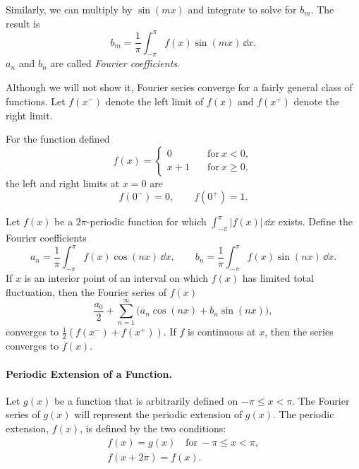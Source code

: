 Similarly, we can multiply by $\sin(m x)$ and integrate to solve for $b_m$.
The result is
\[ 
b_m = \frac{1}{\pi} \int_{-\pi}^\pi f(x) \sin(m x)\,\dd x. 
\]
$a_n$ and $b_n$ are called \textit{Fourier coefficients}.



Although we will not show it, Fourier series converge for a 
fairly general class of functions.
Let $f(x^-)$ denote the left limit of $f(x)$ and $f(x^+)$ denote the right
limit.




\begin{Example}
  For the function defined
  \[ f(x) = 
  \begin{cases}
    0 \quad &\mathrm{for}\ x < 0, \\
    x + 1 \quad &\mathrm{for}\ x \geq 0,
  \end{cases}
  \]
  the left and right limits at $x = 0$ are
  \[ f(0^-) = 0, \qquad f(0^+) = 1.\]
\end{Example}








\begin{Result}
  Let $f(x)$ be a $2\pi$-periodic function for which $\int_{-\pi}^\pi
  |f(x)|\,\dd x$ exists.  Define the Fourier coefficients
  \[ 
  a_n = \frac{1}{\pi} \int_{-\pi}^\pi f(x) \cos(n x)\,\dd x, \qquad
  b_n = \frac{1}{\pi} \int_{-\pi}^\pi f(x) \sin(n x)\,\dd x. 
  \] 
  If $x$ is an interior point of an interval on which $f(x)$ has limited
  total fluctuation, then the Fourier series of $f(x)$
  \[ 
  \frac{a_0}{2} + \sum_{n=1}^\infty \big(a_n \cos(n x) + b_n \sin(n x) \big),
  \]
  converges to $\frac{1}{2} (f(x^-) + f(x^+))$.  If $f$ is continuous at
  $x$, then the series converges to $f(x)$.
\end{Result}






\paragraph{Periodic Extension of a Function.}
Let $g(x)$ be a function that is arbitrarily defined on $-\pi \leq x < \pi$.
The Fourier series of $g(x)$ will represent the periodic extension of $g(x)$.
The periodic extension, $f(x)$, is defined by the two conditions:
\begin{gather*}
  f(x) = g(x) \quad \mathrm{for}\ -\pi \leq x < \pi, \\
  f(x + 2\pi) = f(x).
\end{gather*}


